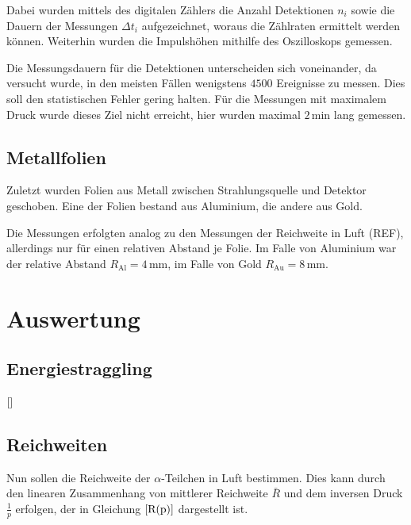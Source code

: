 \documentclass[12pt,a4paper]{scrartcl}
\numberwithin{equation}{section} %
\renewcommand{\[}{} %
\renewcommand{\]}{\noindent} %
\begin{document}
Dabei wurden mittels des digitalen Zählers die Anzahl Detektionen
\(n_i\) sowie die Dauern der Messungen \(\Delta t_i\) aufgezeichnet,
woraus die Zählraten ermittelt werden können. Weiterhin wurden die
Impulshöhen mithilfe des Oszilloskops gemessen.

Die Messungsdauern für die Detektionen unterscheiden sich voneinander,
da versucht wurde, in den meisten Fällen wenigstens \(4500\) Ereignisse
zu messen. Dies soll den statistischen Fehler gering halten. Für die
Messungen mit maximalem Druck wurde dieses Ziel nicht erreicht, hier
wurden maximal \(2\mathrm{\,min}\) lang gemessen.

\hypertarget{metallfolien}{%
\subsection{Metallfolien}\label{metallfolien}}

Zuletzt wurden Folien aus Metall zwischen Strahlungsquelle und Detektor
geschoben. Eine der Folien bestand aus Aluminium, die andere aus Gold.

Die Messungen erfolgten analog zu den Messungen der Reichweite in Luft
(REF), allerdings nur für einen relativen Abstand je Folie. Im Falle von
Aluminium war der relative Abstand \(R_\mathrm{Al}=4\mathrm{\,mm}\), im
Falle von Gold \(R_\mathrm{Au}=8\mathrm{\,mm}\).

\hypertarget{auswertung}{%
\section{Auswertung}\label{auswertung}}

\hypertarget{energiestraggling-1}{%
\subsection{Energiestraggling}\label{energiestraggling-1}}

\(\ref{}\)

\hypertarget{reichweiten}{%
\subsection{Reichweiten}\label{reichweiten}}

Nun sollen die Reichweite der \(\alpha\)-Teilchen in Luft bestimmen.
Dies kann durch den linearen Zusammenhang von mittlerer Reichweite
\(\bar R\) und dem inversen Druck \(\frac{1}{p}\) erfolgen, der in
Gleichung \(\eqref{R(p)}\) dargestellt ist.
\end{document}
